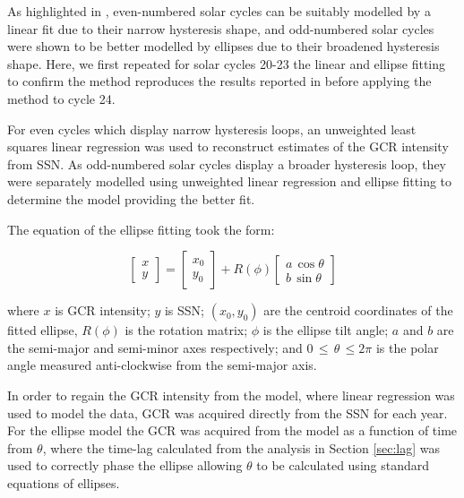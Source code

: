 As highlighted in \citet{inceoglu_modeling_2014}, even-numbered solar cycles can be suitably modelled by a linear fit due to their narrow hysteresis shape, and odd-numbered solar cycles were shown to be better modelled by ellipses due to their broadened hysteresis shape. Here, we first repeated for solar cycles 20-23 the linear and ellipse fitting to confirm the method reproduces the results reported in \citet{inceoglu_modeling_2014} before applying the method to cycle 24.

For even cycles which display narrow hysteresis loops, an unweighted least squares linear regression was used to reconstruct estimates of the GCR intensity from SSN. As odd-numbered solar cycles display a broader hysteresis loop, they were separately modelled using unweighted linear regression and ellipse fitting to determine the model providing the better fit. 

The equation of the ellipse fitting took the form:

\begin{equation}
\left[ \begin{array}{c} x \\ y \end{array} 	\right] = 
\left[ \begin{array}{c} x_0 \\ y_0 \end{array} \right] + 
R(\phi)
\left[ \begin{array}{c} a \, \cos{\theta} \\ b \, \sin{\theta} \end{array} \right]
\label{eq:ellipse}
\end{equation}

where $x$ is GCR intensity; $y$ is SSN; $(x_0, y_0)$ are the centroid coordinates of the fitted ellipse, $R(\phi)$ is the rotation matrix; $\phi$ is the ellipse tilt angle; $a$ and $b$ are the semi-major and semi-minor axes respectively; and $0 \, \leq \, \theta \, \leq 2\pi$ is the polar angle measured anti-clockwise from the semi-major axis.

In order to regain the GCR intensity from the model, where linear regression was used to model the data, GCR was acquired directly from the SSN for each year. For the ellipse model the GCR was acquired from the model as a function of time from $\theta$, where the time-lag calculated from the analysis in Section \ref{sec:lag} was used to correctly phase the ellipse allowing $\theta$ to be calculated using standard equations of ellipses.

